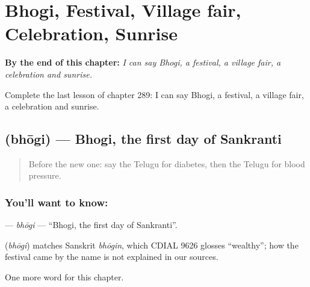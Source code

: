 
\chapter{Bhogi, Festival, Village fair, Celebration, Sunrise}
\label{ch:te-bhogi-festival-village-fair-celebration-sunrise}

\begin{chapteropening}
\textbf{By the end of this chapter:} \emph{I can say Bhogi, a festival, a village fair, a celebration and sunrise.}

Complete the last lesson of chapter 289: I can say Bhogi, a festival, a village fair, a celebration and sunrise.
\end{chapteropening}

\section[\texorpdfstring{\te{భోగి} (bhōgi)}{భోగి (bhōgi)}]{ (bhōgi) — Bhogi, the first day of Sankranti}

\label{lesson:TE-C289-bhogi}



\begin{quote}
Before the new one: say the Telugu for diabetes, then the Telugu for blood pressure.
\end{quote}

\subsection*{You'll want to know: }
\textbf{} — \emph{bhōgi} — \textquotedblleft{}Bhogi, the first day of Sankranti\textquotedblright{}.

\begin{cousinweb}
\textbf{} (\emph{bhōgi}) matches Sanskrit \emph{bhōgin}, which CDIAL 9626 glosses \textquotedblleft{}wealthy\textquotedblright{}; how the festival came by the name is not explained in our sources.
\end{cousinweb}

\begin{grammarlens}[title={What you've built}]
One more word for this chapter.
\end{grammarlens}

